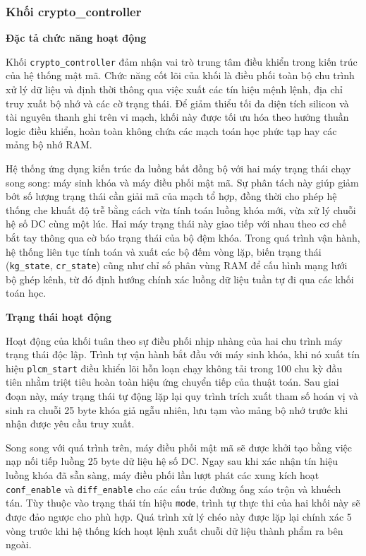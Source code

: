 \subsubsection{Khối crypto\_controller}
\textbf{Đặc tả chức năng hoạt động}

Khối \texttt{crypto\_controller} đảm nhận vai trò trung tâm điều khiển trong kiến trúc của hệ thống mật mã. Chức năng cốt lõi của khối là điều phối toàn bộ chu trình xử lý dữ liệu và định thời thông qua việc xuất các tín hiệu mệnh lệnh, địa chỉ truy xuất bộ nhớ và các cờ trạng thái. Để giảm thiểu tối đa diện tích silicon và tài nguyên thanh ghi trên vi mạch, khối này được tối ưu hóa theo hướng thuần logic điều khiển, hoàn toàn không chứa các mạch toán học phức tạp hay các mảng bộ nhớ RAM.

Hệ thống ứng dụng kiến trúc đa luồng bất đồng bộ với hai máy trạng thái chạy song song: máy sinh khóa và máy điều phối mật mã. Sự phân tách này giúp giảm bớt số lượng trạng thái cần giải mã của mạch tổ hợp, đồng thời cho phép hệ thống che khuất độ trễ bằng cách vừa tính toán luồng khóa mới, vừa xử lý chuỗi hệ số DC cùng một lúc. Hai máy trạng thái này giao tiếp với nhau theo cơ chế bắt tay thông qua cờ báo trạng thái của bộ đệm khóa. Trong quá trình vận hành, hệ thống liên tục tính toán và xuất các bộ đếm vòng lặp, biến trạng thái (\texttt{kg\_state}, \texttt{cr\_state}) cũng như chỉ số phân vùng RAM để cấu hình mạng lưới bộ ghép kênh, từ đó định hướng chính xác luồng dữ liệu tuần tự đi qua các khối toán học.

\textbf{Trạng thái hoạt động}

Hoạt động của khối tuân theo sự điều phối nhịp nhàng của hai chu trình máy trạng thái độc lập. Trình tự vận hành bắt đầu với máy sinh khóa, khi nó xuất tín hiệu \texttt{plcm\_start} điều khiển lõi hỗn loạn chạy không tải trong 100 chu kỳ đầu tiên nhằm triệt tiêu hoàn toàn hiệu ứng chuyển tiếp của thuật toán. Sau giai đoạn này, máy trạng thái tự động lặp lại quy trình trích xuất tham số hoán vị và sinh ra chuỗi 25 byte khóa giả ngẫu nhiên, lưu tạm vào mảng bộ nhớ trước khi nhận được yêu cầu truy xuất.

Song song với quá trình trên, máy điều phối mật mã sẽ được khởi tạo bằng việc nạp nối tiếp luồng 25 byte dữ liệu hệ số DC. Ngay sau khi xác nhận tín hiệu luồng khóa đã sẵn sàng, máy điều phối lần lượt phát các xung kích hoạt \texttt{conf\_enable} và \texttt{diff\_enable} cho các cấu trúc đường ống xáo trộn và khuếch tán. Tùy thuộc vào trạng thái tín hiệu \texttt{mode}, trình tự thực thi của hai khối này sẽ được đảo ngược cho phù hợp. Quá trình xử lý chéo này được lặp lại chính xác 5 vòng trước khi hệ thống kích hoạt lệnh xuất chuỗi dữ liệu thành phẩm ra bên ngoài.


